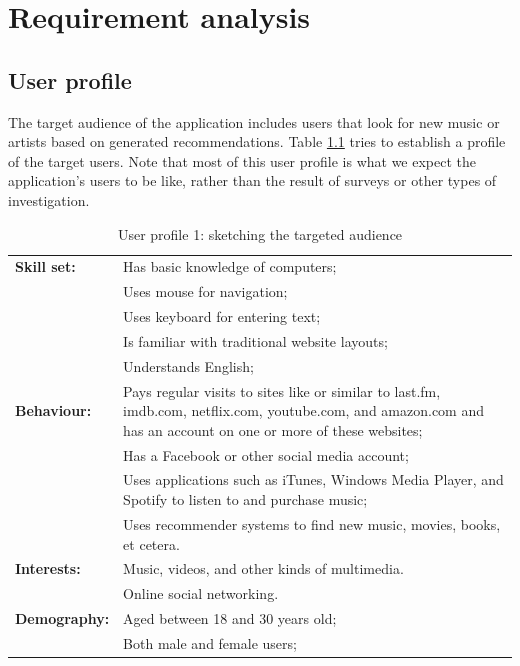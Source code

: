 \chapter{Requirement analysis}\label{chapter:requirements}

\section{User profile}

The target audience of the application includes users that look for new music or artists based on generated recommendations. Table \ref{tab:user_profile1} tries to establish a profile of the target users. Note that most of this user profile is what we expect the application's users to be like, rather than the result of surveys or other types of investigation.

\begin{table}[h]
\caption{User profile 1: sketching the targeted audience}
\begin{center}
	\begin{tabular}{ l p{300px} } %
		\hline
		\textbf{Skill set:}		& Has basic knowledge of computers; \\
													& Uses mouse for navigation; \\
													& Uses keyboard for entering text; \\
													& Is familiar with traditional website layouts; \\
													& Understands English; \\		
		\textbf{Behaviour:}		& Pays regular visits to sites like or similar to last.fm, imdb.com, netflix.com, youtube.com, and amazon.com and has an account on one or more of these websites; \\
													& Has a Facebook or other social media account; \\
													& Uses applications such as iTunes, Windows Media Player, and Spotify to listen to and purchase music; \\
													& Uses recommender systems to find new music, movies, books, et cetera. \\
		\textbf{Interests:}		& Music, videos, and other kinds of multimedia. \\
													& Online social networking. \\
		\textbf{Demography:}	& Aged between 18 and 30 years old; \\
													& Both male and female users; \\		
		\hline
	\end{tabular}
\end{center}
\label{tab:user_profile1}
\end{table}


